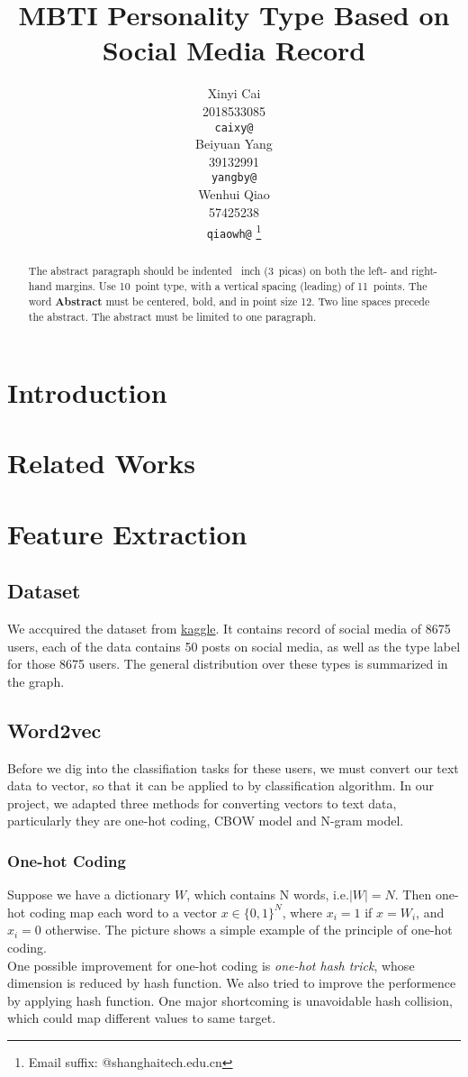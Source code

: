 \documentclass{article}
\title{MBTI Personality Type Based on Social Media Record}
\author{%
  Xinyi Cai\\
  2018533085\\
  \texttt{caixy@} \\
  \And
  Beiyuan Yang \\
  39132991 \\
  \texttt{yangby@} \\
  \And
  Wenhui Qiao \\
  57425238 \\
  \texttt{qiaowh@} \thanks{Email suffix: @shanghaitech.edu.cn} \\
}
\begin{document}
\maketitle

\begin{abstract}
  The abstract paragraph should be indented ~inch (3~picas) on
  both the left- and right-hand margins. Use 10~point type, with a vertical
  spacing (leading) of 11~points.  The word \textbf{Abstract} must be centered,
  bold, and in point size 12. Two line spaces precede the abstract. The abstract
  must be limited to one paragraph.
\end{abstract}

\section{Introduction}


\section{Related Works}


\section{Feature Extraction}
\subsection{Dataset}
We accquired the dataset from \href{https://www.kaggle.com/datasnaek/mbti-type}{kaggle}. It contains record of social media of 8675 users, each of the data contains 50 posts on social media, as well as the type label for those 8675 users. The general distribution over these types is summarized in the graph.

\subsection{Word2vec}
Before we dig into the classifiation tasks for these users, we must convert our text data to vector, so that it can be applied to by classification algorithm. In our project, we adapted three methods for converting vectors to text data, particularly they are one-hot coding, CBOW model and N-gram model.

\subsubsection{One-hot Coding}
Suppose we have a dictionary $W$, which contains N words, i.e.$|W|=N$. Then one-hot coding map each word to a vector $x \in \{0,1\}^N$, where $x_i=1$ if $x=W_i$, and $x_i=0$ otherwise. The picture shows a simple example of the principle of one-hot coding.\\
One possible improvement for one-hot coding is \emph{one-hot hash trick}, whose dimension is reduced by hash function. We also tried to improve the performence by applying hash function. One major shortcoming is unavoidable hash collision, which could map different values to same target.
\end{document}
